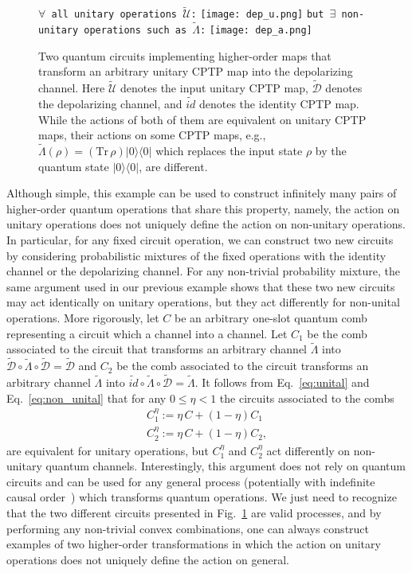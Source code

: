 \documentclass[a4paper,twocolumn,accepted=2022-10-23]{quantumarticle}
\newcommand{\proj}[1]{\vert {#1} \rangle\!\langle {#1} \vert}
\newcommand{\Tr}[0]{{\mathrm{Tr}}}
\newcommand{\tmap}[1]{\widetilde{\mbox{$\mathcal{#1}$}}}
\newcommand{\tmapf}[1]{\widetilde{\mbox{$#1$}}}
\theoremstyle{definition}
\begin{document}
\begin{figure}
\texttt{\quad $\forall$ all unitary operations $\tmap{U}$:}
\texttt{[image: dep\_u.png]}
\texttt{but $\exists$ non-unitary operations such as $\tmapf{\Lambda}$:}
\texttt{[image: dep\_a.png]}
\caption{Two quantum circuits implementing higher-order maps that transform an arbitrary unitary CPTP map into the depolarizing channel.
Here $\tmap{U}$ denotes the input unitary CPTP map, $\tmap{D}$ denotes the depolarizing channel, and $\tmapf{id}$ denotes the identity CPTP map.
While the actions of both of them are equivalent on unitary CPTP maps, their actions on some CPTP maps,
e.g., $\tmapf{\Lambda}(\rho) = (\Tr\, \rho) \proj{0}$ which replaces the input state $\rho$ by the quantum state $\proj{0}$, are different.
}\label{fig:dep_equiv}
\end{figure}
Although simple, this example can be used to construct infinitely many pairs of higher-order quantum operations that share this property, namely, the action on unitary operations does not uniquely define the action on non-unitary operations. In particular, for any fixed circuit operation, we can construct two new circuits by considering probabilistic mixtures of the fixed operations with the identity channel or the depolarizing channel. For any non-trivial probability mixture, the same argument used in our previous example shows that these two new circuits may act identically on unitary operations, but they act differently for non-unital operations. 
More rigorously, let $C$ be an arbitrary one-slot quantum comb \cite{comb1,comb2,comb3} representing a circuit which a channel into a channel. Let $C_1$ be the comb associated to the circuit that transforms an arbitrary channel $\tmapf{\Lambda}$ into $\tmap{D}\circ \tmapf{\Lambda} \circ \tmap{D} =	 \tmap{D}$ and $C_2$ be the comb associated to the circuit transforms an arbitrary channel $\tmapf{\Lambda}$ into $\tmapf{id}\circ \tmapf{\Lambda} \circ \tmap{D} = \tmapf{\Lambda}$. It follows from Eq.~\eqref{eq:unital} and Eq.~\eqref{eq:non_unital} that for any $0 \leq \eta<1$ the circuits associated to the combs
\begin{align}
    C^\eta_1:=\eta \,C + (1-\eta) C_1 \\
    C^\eta_2:=\eta \,C + (1-\eta) C_2,
\end{align}
are equivalent for unitary operations, but $C^\eta_1$ and $C^\eta_2$ act differently on non-unitary quantum channels.
Interestingly, this argument does not rely on quantum circuits and can be used for any general process (potentially with indefinite causal order~\cite{qswitch}) which transforms quantum operations. We just need to recognize that the two different circuits presented in Fig.~\ref{fig:dep_equiv} are valid processes, and by performing any non-trivial convex combinations, one can always construct examples of two higher-order transformations in which the action on unitary operations does not uniquely define the action on general.
\end{document}
